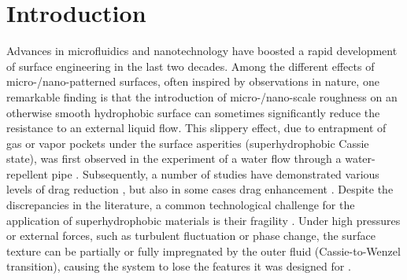

\section{Introduction}

Advances in microfluidics and nanotechnology have boosted a rapid development of surface engineering in the last two decades. Among the different effects of micro-/nano-patterned surfaces, often inspired by observations in nature, one remarkable finding is that the introduction of micro-/nano-scale roughness on an otherwise smooth hydrophobic surface can sometimes significantly reduce the resistance to an external liquid flow. This slippery effect, due to entrapment of gas or vapor pockets under the surface asperities (superhydrophobic Cassie state), was first observed in the experiment of a water flow through a water-repellent pipe \citep{Watanabe}. Subsequently, a number of studies have demonstrated various levels of drag reduction \citep{Ou,Choi_Kim,Schaffel,Lee}, but also in some cases drag enhancement \citep{Steinberger,Karatay}. Despite the discrepancies in the literature, a common technological challenge for the application of superhydrophobic materials is their fragility \citep{Bocquet}. Under high pressures or external forces, such as turbulent fluctuation or phase change, the surface texture can be partially or fully impregnated by the outer fluid (Cassie-to-Wenzel transition), causing the system to lose the features it was designed for \citep{Gentili,Giacomello, Seo_etal_18}.

